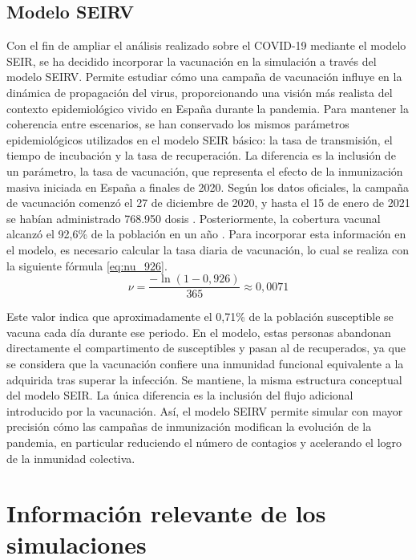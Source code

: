 \subsection{Modelo SEIRV}
Con el fin de ampliar el análisis realizado sobre el COVID-19 mediante el modelo SEIR, se ha decidido incorporar la vacunación en la simulación a través del modelo SEIRV. Permite estudiar cómo una campaña de vacunación influye en la dinámica de propagación del virus, proporcionando una visión más realista del contexto epidemiológico vivido en España durante la pandemia.
Para mantener la coherencia entre escenarios, se han conservado los mismos parámetros epidemiológicos utilizados en el modelo SEIR básico: la tasa de transmisión, el tiempo de incubación y la tasa de recuperación. La diferencia es la inclusión de un parámetro, la tasa de vacunación, que representa el efecto de la inmunización masiva iniciada en España a finales de 2020.
Según los datos oficiales, la campaña de vacunación comenzó el 27 de diciembre de 2020, y hasta el 15 de enero de 2021 se habían administrado 768.950 dosis \cite{sanidad_giv_20210115}. Posteriormente, la cobertura vacunal alcanzó el 92,6\% de la población en un año \cite{sanidad_historico_covid}. Para incorporar esta información en el modelo, es necesario calcular la tasa diaria de vacunación, lo cual se realiza con la siguiente fórmula \eqref{eq:nu_926}.
\begin{equation}
\nu = \frac{-\ln(1 - 0{,}926)}{365} \approx 0{,}0071
\label{eq:nu_926}
\end{equation}

Este valor indica que aproximadamente el 0,71\% de la población susceptible se vacuna cada día durante ese periodo. En el modelo, estas personas abandonan directamente el compartimento de susceptibles y pasan al de recuperados, ya que se considera que la vacunación confiere una inmunidad funcional equivalente a la adquirida tras superar la infección.
Se mantiene, la misma estructura conceptual del modelo SEIR. La única diferencia es la inclusión del flujo adicional introducido por la vacunación. Así, el modelo SEIRV permite simular con mayor precisión cómo las campañas de inmunización modifican la evolución de la pandemia, en particular reduciendo el número de contagios y acelerando el logro de la inmunidad colectiva.



\section{Información relevante de los simulaciones}


